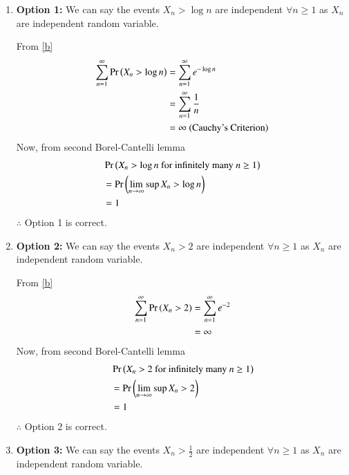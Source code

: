 \documentclass[journal,12pt,twocolumn]{IEEEtran}
\begin{document}
\begin{enumerate}
    \item \textbf{Option 1:} 
    We can say the events $X_n>\log n$ are independent $\forall n\geq 1$ as $X_n$ are independent random variable.
    
    From \eqref{b}
    \begin{align}
        \sum_{n=1}^{\infty}\Pr\left(X_n > \log n\right) &=\sum_{n=1}^{\infty}e^{-\log n}\nonumber\\ &=\sum_{n=1}^{\infty}\frac{1}{n}\nonumber\\
                                            &= \infty  \text{ (Cauchy's Criterion)}\nonumber
    \end{align}
    Now, from second Borel-Cantelli lemma
    \begin{align}
        &\Pr\left(X_n>\log n \text{ for infinitely many }n\geq1\right)\nonumber\\
        &=\Pr\left(\lim_{n \rightarrow \infty}\sup X_n>\log n\right)\nonumber\\
        &=1\nonumber
    \end{align}
    $\therefore$ Option 1 is correct. 
    
    \item\textbf{Option 2:} We can say the events $X_n>2$ are independent $\forall n\geq 1$ as $X_n$ are independent random variable.
    
    From \eqref{b}
    \begin{align}
        \sum_{n=1}^{\infty}\Pr\left(X_n > 2\right) &= \sum_{n=1}^{\infty}e^{-2}\nonumber\\
                                            &= \infty\nonumber
    \end{align}
    Now, from second Borel-Cantelli lemma
    \begin{align}
        &\Pr\left(X_n>2 \text{ for infinitely many }n\geq1\right)\nonumber\\
        &=\Pr\left(\lim_{n \rightarrow \infty}\sup X_n>2\right)\nonumber\\
        &=1\nonumber
    \end{align}
    $\therefore$ Option 2 is correct.
    
    \item \textbf{Option 3:} We can say the events $X_n>\frac{1}{2}$ are independent $\forall n\geq 1$ as $X_n$ are independent random variable.
    

\end{enumerate}
\end{document}
